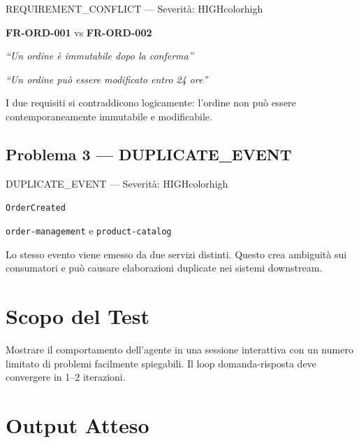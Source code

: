 \documentclass[12pt,a4paper]{report}
\begin{document}
\begin{issuebox}{REQUIREMENT\_CONFLICT --- Severità: HIGH}{colorhigh}
\begin{description}[leftmargin=3cm, labelwidth=2.8cm]
  \item[Requisiti] \textbf{FR-ORD-001} vs \textbf{FR-ORD-002}
  \item[FR-ORD-001] \textit{``Un ordine è immutabile dopo la conferma''}
  \item[FR-ORD-002] \textit{``Un ordine può essere modificato entro 24 ore''}
  \item[Conflitto]  I due requisiti si contraddicono logicamente: l'ordine non
                   può essere contemporaneamente immutabile e modificabile.
\end{description}
\end{issuebox}

\subsection{Problema 3 --- DUPLICATE\_EVENT}

\begin{issuebox}{DUPLICATE\_EVENT --- Severità: HIGH}{colorhigh}
\begin{description}[leftmargin=3cm, labelwidth=2.8cm]
  \item[Evento]    \texttt{OrderCreated}
  \item[Emittenti] \texttt{order-management} e \texttt{product-catalog}
  \item[Problema]  Lo stesso evento viene emesso da due servizi distinti.
                   Questo crea ambiguità sui consumatori e può causare
                   elaborazioni duplicate nei sistemi downstream.
\end{description}
\end{issuebox}

\section{Scopo del Test}

Mostrare il comportamento dell'agente in una sessione interattiva con un numero
limitato di problemi facilmente spiegabili. Il loop domanda-risposta deve convergere
in 1--2 iterazioni.

\section{Output Atteso}
\end{document}
